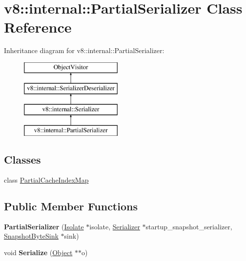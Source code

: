\hypertarget{classv8_1_1internal_1_1_partial_serializer}{}\section{v8\+:\+:internal\+:\+:Partial\+Serializer Class Reference}
\label{classv8_1_1internal_1_1_partial_serializer}
Inheritance diagram for v8\+:\+:internal\+:\+:Partial\+Serializer\+:\begin{figure}[H]
\begin{center}
\leavevmode
\includegraphics[height=4.000000cm]{classv8_1_1internal_1_1_partial_serializer}
\end{center}
\end{figure}
\subsection*{Classes}
\begin{DoxyCompactItemize}
\item 
class \hyperlink{classv8_1_1internal_1_1_partial_serializer_1_1_partial_cache_index_map}{Partial\+Cache\+Index\+Map}
\end{DoxyCompactItemize}
\subsection*{Public Member Functions}
\begin{DoxyCompactItemize}
\item 
{\bfseries Partial\+Serializer} (\hyperlink{classv8_1_1internal_1_1_isolate}{Isolate} $\ast$isolate, \hyperlink{classv8_1_1internal_1_1_serializer}{Serializer} $\ast$startup\+\_\+snapshot\+\_\+serializer, \hyperlink{classv8_1_1internal_1_1_snapshot_byte_sink}{Snapshot\+Byte\+Sink} $\ast$sink)\hypertarget{classv8_1_1internal_1_1_partial_serializer_a80742cc5e60ae1edd95cc20c64685364}{}\label{classv8_1_1internal_1_1_partial_serializer_a80742cc5e60ae1edd95cc20c64685364}

\item 
void {\bfseries Serialize} (\hyperlink{classv8_1_1internal_1_1_object}{Object} $\ast$$\ast$o)\hypertarget{classv8_1_1internal_1_1_partial_serializer_a2bab2ee122ae1fd8049116828dfaae5b}{}\label{classv8_1_1internal_1_1_partial_serializer_a2bab2ee122ae1fd8049116828dfaae5b}

\end{DoxyCompactItemize}
